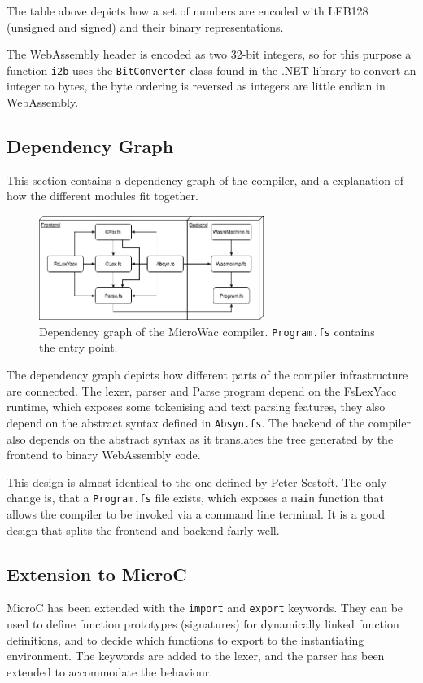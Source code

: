 \documentclass[a4paper]{article}
\begin{document}
The table above depicts how a set of numbers are encoded with LEB128 (unsigned and signed) and their binary representations.

The WebAssembly header is encoded as two 32-bit integers, so for this purpose a function \texttt{i2b} uses the \texttt{BitConverter} class found in the .NET library to convert an integer to bytes, the byte ordering is reversed as integers are little endian in WebAssembly.

\subsection{Dependency Graph}
\label{sec:technical:dependency-graph}
This section contains a dependency graph of the compiler, and a explanation of how the different modules fit together.

\begin{figure}[H]
	\includegraphics[width=0.65\textwidth]{DependencyGraph}
	\centering
	\caption{Dependency graph of the MicroWac compiler. \texttt{Program.fs} contains the entry point.}
\end{figure}

The dependency graph depicts how different parts of the compiler infrastructure are connected. The lexer, parser and Parse program depend on the FsLexYacc runtime, which exposes some tokenising and text parsing features, they also depend on the abstract syntax defined in \texttt{Absyn.fs}. The backend of the compiler also depends on the abstract syntax as it translates the tree generated by the frontend to binary WebAssembly code.

This design is almost identical to the one defined by Peter Sestoft. The only change is, that a \texttt{Program.fs} file exists, which exposes a \texttt{main} function that allows the compiler to be invoked via a command line terminal. It is a good design that splits the frontend and backend fairly well.

\newpage
\subsection{Extension to MicroC}
\label{sec:technical:extension}
MicroC has been extended with the \texttt{import} and \texttt{export} keywords. They can be used to define function prototypes (signatures) for dynamically linked function definitions, and to decide which functions to export to the instantiating environment. The keywords are added to the lexer, and the parser has been extended to accommodate the behaviour.
\end{document}

